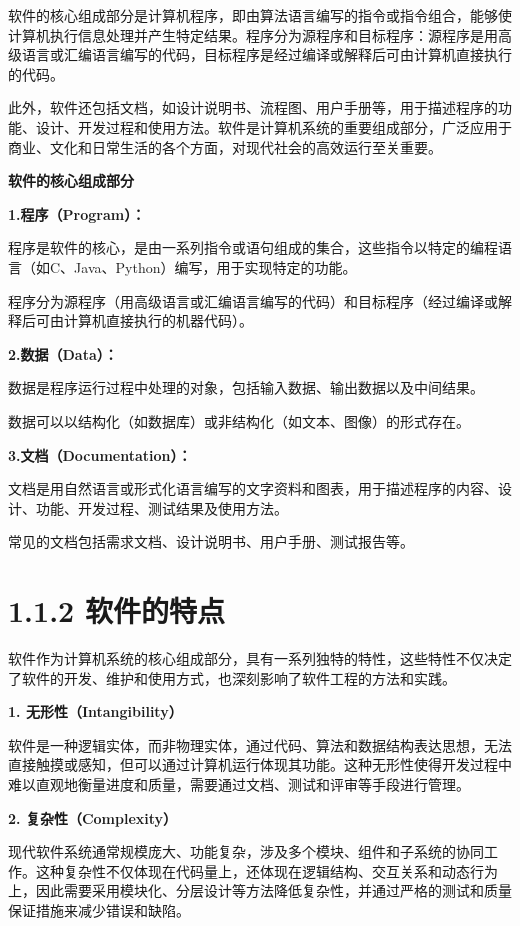 \documentclass[12pt,a4paper]{ctexbook}
\begin{document}
软件的核心组成部分是计算机程序，即由算法语言编写的指令或指令组合，能够使计算机执行信息处理并产生特定结果。程序分为源程序和目标程序：源程序是用高级语言或汇编语言编写的代码，目标程序是经过编译或解释后可由计算机直接执行的代码。

此外，软件还包括文档，如设计说明书、流程图、用户手册等，用于描述程序的功能、设计、开发过程和使用方法。软件是计算机系统的重要组成部分，广泛应用于商业、文化和日常生活的各个方面，对现代社会的高效运行至关重要。

\textbf{软件的核心组成部分}

\textbf{1.程序（Program）：}

程序是软件的核心，是由一系列指令或语句组成的集合，这些指令以特定的编程语言（如C、Java、Python）编写，用于实现特定的功能。

程序分为源程序（用高级语言或汇编语言编写的代码）和目标程序（经过编译或解释后可由计算机直接执行的机器代码）。

\textbf{2.数据（Data）：}

数据是程序运行过程中处理的对象，包括输入数据、输出数据以及中间结果。

数据可以以结构化（如数据库）或非结构化（如文本、图像）的形式存在。

\textbf{3.文档（Documentation）：}

文档是用自然语言或形式化语言编写的文字资料和图表，用于描述程序的内容、设计、功能、开发过程、测试结果及使用方法。

常见的文档包括需求文档、设计说明书、用户手册、测试报告等。


\section{1.1.2 软件的特点}\label{ux8f6fux4ef6ux7684ux7279ux70b9}

软件作为计算机系统的核心组成部分，具有一系列独特的特性，这些特性不仅决定了软件的开发、维护和使用方式，也深刻影响了软件工程的方法和实践。

\textbf{1. 无形性（Intangibility）}

软件是一种逻辑实体，而非物理实体，通过代码、算法和数据结构表达思想，无法直接触摸或感知，但可以通过计算机运行体现其功能。这种无形性使得开发过程中难以直观地衡量进度和质量，需要通过文档、测试和评审等手段进行管理。

\textbf{2. 复杂性（Complexity）}

现代软件系统通常规模庞大、功能复杂，涉及多个模块、组件和子系统的协同工作。这种复杂性不仅体现在代码量上，还体现在逻辑结构、交互关系和动态行为上，因此需要采用模块化、分层设计等方法降低复杂性，并通过严格的测试和质量保证措施来减少错误和缺陷。
\end{document}
